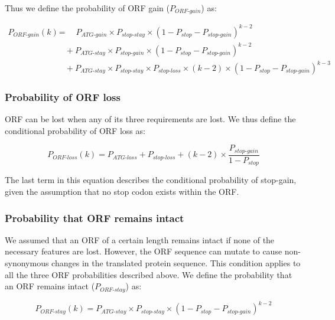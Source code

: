 \documentclass[12pt,a4paper]{article}
\begin{document}
Thus we define the probability of ORF gain ($P_\textit{ORF-gain}$) as:

\begin{align}
P_\textit{ORF-gain}(k) & = \quad P_\textit{ATG-gain}\times P_\textit{stop-stay} \times (1- P_\textit{stop} - P_\textit{stop-gain})^{k-2} \nonumber \\[1pt]
& \quad + P_\textit{ATG-stay}\times P_\textit{stop-gain} \times (1- P_\textit{stop} - P_\textit{stop-gain})^{k-2} \nonumber \\[1pt]
& \quad + P_\textit{ATG-stay}\times P_\textit{stop-stay} \times P_\textit{stop-loss}\times(k-2) \times (1- P_\textit{stop} - P_\textit{stop-gain})^{k-3} 
\label{eqorfgain}
\end{align}

\subsubsection{Probability of ORF loss}

ORF can be lost when any of its three requirements are lost. We thus define the conditional probability of ORF loss as:

\begin{equation}
P_\textit{ORF-loss}(k) = P_\textit{ATG-loss} + P_\textit{stop-loss} + (k-2)\times \frac{P_\textit{stop-gain}}{1-P_\textit{stop}}
\label{eqorfloss}
\end{equation}

The last term in this equation describes the conditional probability of stop-gain, given the assumption that no stop codon exists within the ORF.

\subsubsection{Probability that ORF remains intact}

We assumed that an ORF of a certain length remains intact if none of the necessary features are lost. However, the ORF sequence can mutate to cause non-synonymous changes in the translated protein sequence. This condition applies to all the three ORF probabilities described above. We define the probability that an ORF remains intact ($P_\textit{ORF-stay}$) as:

\begin{equation}
P_\textit{ORF-stay}(k) = P_\textit{ATG-stay} \times P_\textit{stop-stay} \times (1 - P_\textit{stop} - P_\textit{stop-gain})^{k-2}
\label{eqorfstay}
\end{equation}
\end{document}
